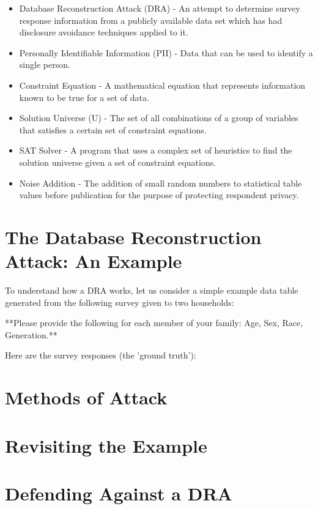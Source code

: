 \documentclass[jou,apacite]{apa6}
\begin{document}
\begin{itemize}
\item Database Reconstruction Attack (DRA) - An attempt to determine survey response information from a publicly available data set which has had disclosure avoidance techniques applied to it.

\item Personally Identifiable Information (PII) - Data that can be used to identify a single person.

\item Constraint Equation - A mathematical equation that represents information known to be true for a set of data.

\item Solution Universe (U) - The set of all combinations of a
group of variables that satisfies a certain set of constraint equations.

\item SAT Solver - A program that uses a complex set of heuristics to find the solution universe given a set of constraint equations.

\item Noise Addition - The addition of small random numbers to statistical table values before publication for the purpose of protecting respondent privacy.
\end{itemize}

\section{The Database Reconstruction Attack: An Example}
To understand how a DRA works, let us consider a simple example data table generated from the following survey given to two households:

**Please provide the following for each member of your family:
Age, Sex, Race, Generation.**

Here are the survey responses (the 'ground truth'):
\section{Methods of Attack}

\section{Revisiting the Example}

\section{Defending Against a DRA}
\end{document}
